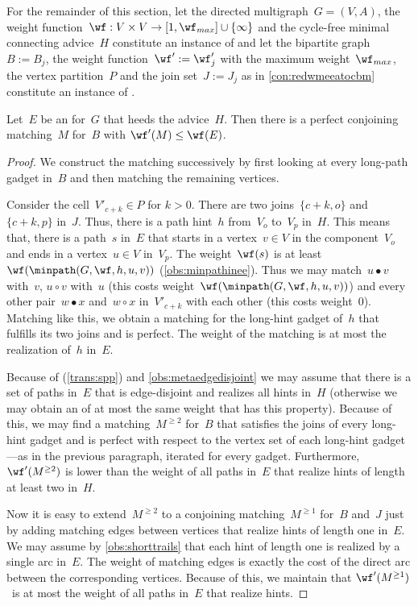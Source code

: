 For the remainder of this section, let the directed multigraph~$G=(V,A)$, the weight function~$\wf: V \times V \rightarrow [1, \wf_{max}]\cup \{\infty\}$ and the cycle-free minimal connecting advice~$H$ constitute an instance of \pWMEECCLAs{} and let the bipartite graph~$B := B_j$, the weight function~$\wf' := \wf'_j$ with the maximum weight~$\wf_{max}$, the vertex partition~$P$ and the join set~$J := J_j$ as in \autoref{con:redwmeeatocbm} constitute an instance of \pCBMs{}.

\begin{lemma}
  \label{lem:redwmeeatocbmtransfer}
  Let~$E$ be an \EE{} for~$G$ that heeds the advice~$H$. Then there is a perfect conjoining matching~$M$ for~$B$ with $\wf'(M) \leq \wf(E)$.
\end{lemma}
\begin{proof}
  We construct the matching successively by first looking at every long-path gadget in~$B$ and then matching the remaining vertices.

  Consider the cell~$V'_{c + k} \in P$ for $k>0$. There are two joins~$\{c+k, o\}$ and~$\{c+k, p\}$ in~$J$. Thus, there is a path hint~$h$ from~$V_o$ to~$V_p$ in~$H$. This means that, there is a path~$s$ in~$E$ that starts in a vertex~$v \in V$ in the component~$V_o$ and ends in a vertex~$u \in V$ in~$V_p$. The weight~$\wf(s)$ is at least~$\wf(\minpath(G,\wf,h,u,v))$ (\autoref{obs:minpathinee}). Thus we may match~$u \bullet v$ with~$v$, $u \circ v$ with~$u$ (this costs weight~$\wf(\minpath(G,\wf,h,u,v))$) and every other pair~$w \bullet x$ and~$w \circ x$ in~$V'_{c + k}$ with each other (this costs weight~$0$). Matching like this, we obtain a matching for the long-hint gadget of~$h$ that fulfills its two joins and is perfect. The weight of the matching is at most the realization of~$h$ in~$E$. 

Because of \SPP{} (\autoref{trans:spp}) and \autoref{obs:metaedgedisjoint} we may assume that there is a set of paths in~$E$ that is edge-disjoint and realizes all hints in~$H$ (otherwise we may obtain an \EE{} of at most the same weight that has this property). Because of this, we may find a matching~$M^{\geq 2}$ for~$B$ that satisfies the joins of every long-hint gadget and is perfect with respect to the vertex set of each long-hint gadget---as in the previous paragraph, iterated for every gadget. Furthermore,~$\wf'(M^{\geq 2})$ is lower than the weight of all paths in~$E$ that realize hints of length at least two in~$H$. 

Now it is easy to extend~$M^{\geq 2}$ to a conjoining matching~$M^{\geq 1}$ for~$B$ and~$J$ just by adding matching edges between vertices that realize hints of length one in~$E$. We may assume by \autoref{obs:shorttrails} that each hint of length one is realized by a single arc in~$E$. The weight of matching edges is exactly the cost of the direct arc between the corresponding vertices. Because of this, we maintain that $\wf'(M^{\geq 1})$~is at most the weight of all paths in~$E$ that realize hints. 


\end{proof}
